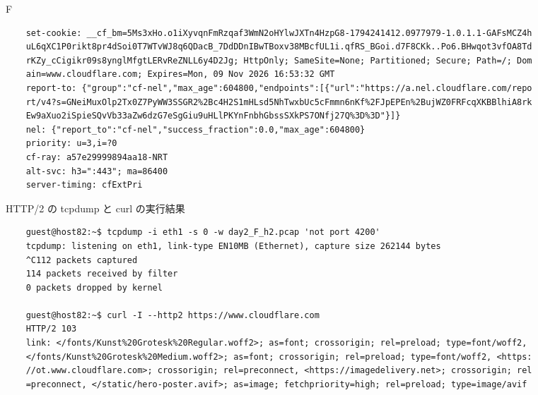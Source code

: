 \begin{maintask}{F}
\begin{termout}[H]
\begin{verbatim}
    set-cookie: __cf_bm=5Ms3xHo.o1iXyvqnFmRzqaf3WmN2oHYlwJXTn4HzpG8-1794241412.0977979-1.0.1.1-GAFsMCZ4h
    uL6qXC1P0rikt8pr4dSoi0T7WTvWJ8q6QDacB_7DdDDnIBwTBoxv38MBcfUL1i.qfRS_BGoi.d7F8CKk..Po6.BHwqot3vfOA8Td
    rKZy_cCigikr09s8ynglMfgtLERvReZNLL6y4D2Jg; HttpOnly; SameSite=None; Partitioned; Secure; Path=/; Dom
    ain=www.cloudflare.com; Expires=Mon, 09 Nov 2026 16:53:32 GMT                                       
    report-to: {"group":"cf-nel","max_age":604800,"endpoints":[{"url":"https://a.nel.cloudflare.com/repo
    rt/v4?s=GNeiMuxOlp2Tx0Z7PyWW3SSGR2%2Bc4H2S1mHLsd5NhTwxbUc5cFmmn6nKf%2FJpEPEn%2BujWZ0FRFcqXKBBlhiA8rk
    Ew9aXuo2iSpieSQvVb33aZw6dzG7eSgGiu9uHLlPKYnFnbhGbssSXkPS7ONfj27Q%3D%3D"}]}                          
    nel: {"report_to":"cf-nel","success_fraction":0.0,"max_age":604800}                                 
    priority: u=3,i=?0                                                                                  
    cf-ray: a57e29999894aa18-NRT                                                                        
    alt-svc: h3=":443"; ma=86400                                                                        
    server-timing: cfExtPri   
    \end{verbatim}
  \end{termout}

  \begin{termout}[H]
    \caption{HTTP/2 の tcpdump と curl の実行結果}\label{out:f_h2}
    \begin{verbatim}
    guest@host82:~$ tcpdump -i eth1 -s 0 -w day2_F_h2.pcap 'not port 4200'
    tcpdump: listening on eth1, link-type EN10MB (Ethernet), capture size 262144 bytes
    ^C112 packets captured
    114 packets received by filter
    0 packets dropped by kernel

    guest@host82:~$ curl -I --http2 https://www.cloudflare.com
    HTTP/2 103 
    link: </fonts/Kunst%20Grotesk%20Regular.woff2>; as=font; crossorigin; rel=preload; type=font/woff2, 
    </fonts/Kunst%20Grotesk%20Medium.woff2>; as=font; crossorigin; rel=preload; type=font/woff2, <https:
    //ot.www.cloudflare.com>; crossorigin; rel=preconnect, <https://imagedelivery.net>; crossorigin; rel
    =preconnect, </static/hero-poster.avif>; as=image; fetchpriority=high; rel=preload; type=image/avif


\end{verbatim}
\end{termout}
\end{maintask}
